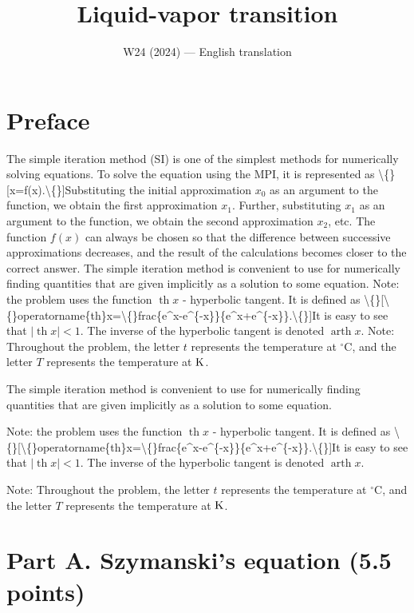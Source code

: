 \documentclass[11pt,a4paper]{article}
\title{\textbf{Liquid-vapor transition}}
\author{\normalsize W24 (2024) --- English translation}
\date{}
\begin{document}
\maketitle

\section*{Preface}

The simple iteration method (SI) is one of the simplest methods for numerically solving equations. To solve the equation using the MPI, it is represented as \textbackslash\{\}[x=f(x).\textbackslash\{\}]Substituting the initial approximation $x_0$ as an argument to the function, we obtain the first approximation $x_1$. Further, substituting $x_1$ as an argument to the function, we obtain the second approximation $x_2$, etc. The function $f(x)$ can always be chosen so that the difference between successive approximations decreases, and the result of the calculations becomes closer to the correct answer. The simple iteration method is convenient to use for numerically finding quantities that are given implicitly as a solution to some equation. Note: the problem uses the function $\operatorname{th}x$ - hyperbolic tangent. It is defined as \textbackslash\{\}[\textbackslash\{\}operatorname\{th\}x=\textbackslash\{\}frac\{e^x-e^\{-x\}\}\{e^x+e^\{-x\}\}.\textbackslash\{\}]It is easy to see that $|\operatorname{th}x| < 1$. The inverse of the hyperbolic tangent is denoted $\operatorname{arth}x$. Note: Throughout the problem, the letter $t$ represents the temperature at ${}^\circ\mathrm C$, and the letter $T$ represents the temperature at $\rm K$.

The simple iteration method is convenient to use for numerically finding quantities that are given implicitly as a solution to some equation.

Note: the problem uses the function $\operatorname{th}x$ - hyperbolic tangent. It is defined as \textbackslash\{\}[\textbackslash\{\}operatorname\{th\}x=\textbackslash\{\}frac\{e^x-e^\{-x\}\}\{e^x+e^\{-x\}\}.\textbackslash\{\}]It is easy to see that $|\operatorname{th}x| < 1$. The inverse of the hyperbolic tangent is denoted $\operatorname{arth}x$.

Note: Throughout the problem, the letter $t$ represents the temperature at ${}^\circ\mathrm C$, and the letter $T$ represents the temperature at $\rm K$.

\section*{Part A. Szymanski's equation (5.5 points)}
\end{document}
